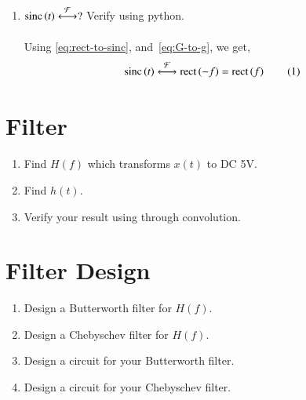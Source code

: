 \documentclass[journal,12pt,twocolumn]{IEEEtran}
\renewcommand\thesection{\arabic{section}}
\begin{document}
\begin{enumerate}[label=\thesection.\arabic*, ref=\thesection.\theenumi]
\item 
	$\text{sinc}\left(t\right)\overset{\mathcal{F}}{ \longleftrightarrow} ?$
	Verify using python. \\
	\solution \\
	Using \eqref{eq:rect-to-sinc}, and~\eqref{eq:G-to-g}, we get,
	\[ \sinc{t} \system{F} \rect{-f} = \rect{f} \numberthis \label{eq:sinc-to-rect} \]


\end{enumerate}



\section{Filter}
\begin{enumerate}[label=\thesection.\arabic*, ref=\thesection.\theenumi]


\item Find $H(f)$ which transforms $x(t)$ to DC 5V. \\
	\solution

\item Find $h(t)$.


\item Verify your result using  through convolution.


\end{enumerate}



\section{Filter Design}

\begin{enumerate}[label=\thesection.\arabic*, ref=\thesection.\theenumi]


\item Design a Butterworth filter for $H(f)$.


\item Design a Chebyschev filter for $H(f)$.


\item Design a circuit for your Butterworth filter.


\item Design a circuit for your Chebyschev filter.


\end{enumerate}
\end{document}
